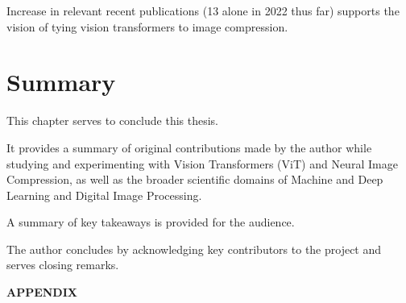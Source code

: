 \documentclass[pdftex,11pt,titlepage,twoside,openright]{report}
\begin{document}
Increase in relevant recent publications (13 alone in 2022 thus far) supports the vision of tying 
vision transformers to image compression.

\ThinHRule

\newpage


\chapter{Summary}

This chapter serves to conclude this thesis. 

It provides a summary 
of original contributions made by the author while studying and experimenting 
with Vision Transformers (ViT) and Neural Image Compression, as well as the broader 
scientific domains of Machine and Deep Learning and Digital Image Processing. 

A summary of key takeaways is provided for the audience.

The author concludes by acknowledging key contributors to the project and serves closing
remarks.


\ThinHRule

\newpage



{} %
\pagestyle{plain}






\newpage
{} %
\pagestyle{plain}
{\textbf{\LARGE{APPENDIX}}}\\	%

\end{document}

